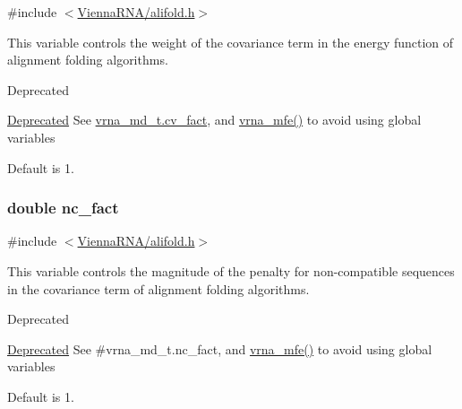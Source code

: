 {\ttfamily \#include $<$\hyperlink{alifold_8h}{Vienna\+R\+N\+A/alifold.\+h}$>$}



This variable controls the weight of the covariance term in the energy function of alignment folding algorithms. 

\begin{DoxyRefDesc}{Deprecated}
\item[\hyperlink{deprecated__deprecated000016}{Deprecated}]See \hyperlink{group__model__details_a62ebefb9d0643e5c4c8a2ec84a105ce6}{vrna\+\_\+md\+\_\+t.\+cv\+\_\+fact}, and \hyperlink{group__mfe__fold_gabd3b147371ccf25c577f88bbbaf159fd}{vrna\+\_\+mfe()} to avoid using global variables\end{DoxyRefDesc}


Default is 1. \hypertarget{group__consensus__fold_ga502948a122a2af5b914355b1f3ea2f61}{}
\subsubsection[{nc\+\_\+fact}]{\setlength{\rightskip}{0pt plus 5cm}double nc\+\_\+fact}\label{group__consensus__fold_ga502948a122a2af5b914355b1f3ea2f61}


{\ttfamily \#include $<$\hyperlink{alifold_8h}{Vienna\+R\+N\+A/alifold.\+h}$>$}



This variable controls the magnitude of the penalty for non-\/compatible sequences in the covariance term of alignment folding algorithms. 

\begin{DoxyRefDesc}{Deprecated}
\item[\hyperlink{deprecated__deprecated000017}{Deprecated}]See \#vrna\+\_\+md\+\_\+t.\+nc\+\_\+fact, and \hyperlink{group__mfe__fold_gabd3b147371ccf25c577f88bbbaf159fd}{vrna\+\_\+mfe()} to avoid using global variables\end{DoxyRefDesc}


Default is 1. 